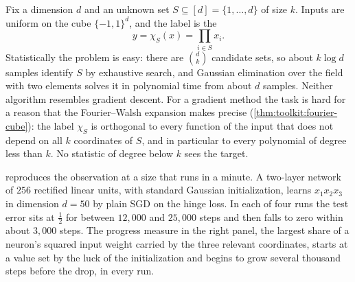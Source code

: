 \begin{refsection}
Fix a dimension $d$ and an unknown set $S\subseteq[d]=\{1,\dots,d\}$ of size $k$. Inputs are uniform on the cube $\{-1,1\}^d$, and the label is the 
\[
  y=\chi_S(x)=\prod_{i\in S}x_i .
\]
Statistically the problem is easy: there are $\binom dk$ candidate sets, so about $k\log d$ samples identify $S$ by exhaustive search, and Gaussian elimination over the field with two elements solves it in polynomial time from about $d$ samples. Neither algorithm resembles gradient descent. For a gradient method the task is hard for a reason that the Fourier--Walsh expansion makes precise (\cref{thm:toolkit:fourier-cube}): the label $\chi_S$ is orthogonal to every function of the input that does not depend on all $k$ coordinates of $S$, and in particular to every polynomial of degree less than $k$. No statistic of degree below $k$ sees the target.


 reproduces the observation at a size that runs in a minute. A two-layer network of $256$ rectified linear units, with standard Gaussian initialization, learns $x_1x_2x_3$ in dimension $d=50$ by plain SGD on the hinge loss. In each of four runs the test error sits at $\frac12$ for between $12{,}000$ and $25{,}000$ steps and then falls to zero within about $3{,}000$ steps. The progress measure in the right panel, the largest share of a neuron's squared input weight carried by the three relevant coordinates, starts at a value set by the luck of the initialization and begins to grow several thousand steps before the drop, in every run.


\end{refsection}
